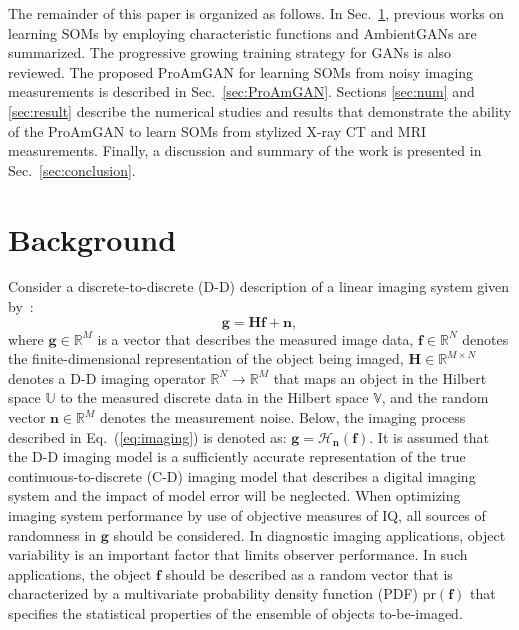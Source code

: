 \documentclass[journal]{IEEEtran}
\begin{document}
The remainder of this paper is organized as follows. 
In Sec.~\ref{sec:bkgd}, previous works on learning SOMs
 by employing characteristic functions and AmbientGANs 
are summarized.  
The progressive growing training strategy for GANs is also reviewed.
The proposed ProAmGAN for learning SOMs from noisy
 imaging measurements is described in Sec.~\ref{sec:ProAmGAN}.
Sections \ref{sec:num} and \ref{sec:result} describe the numerical studies and results
that demonstrate the ability of the ProAmGAN to learn SOMs from
stylized X-ray CT and MRI measurements.
Finally,  a discussion and summary of the work is presented in
Sec.~\ref{sec:conclusion}.

\section{Background}
\label{sec:bkgd}

Consider a discrete-to-discrete (D-D) description of 
a linear imaging system given by~\cite{barrett2013foundations}:
\begin{equation}\label{eq:imaging}
    \mathbf{g} = \mathbf{H}\mathbf{f} + \mathbf{n},
\end{equation}
%
\noindent where $\mathbf{g} \in \mathbb{R}^M$ is a vector that describes the measured image data,
$\mathbf{f} \in \mathbb{R}^N$ denotes the finite-dimensional representation of the object being imaged, 
$\mathbf{H}\in \mathbb{R}^{M\times N}$ denotes a D-D imaging operator $\mathbb{R}^N\rightarrow \mathbb{R}^M$ that maps an object in the Hilbert space $\mathbb{U}$ to the measured discrete data in the Hilbert space $\mathbb{V}$, 
and the random vector $\mathbf{n} \in \mathbb{R}^M$ denotes the measurement noise. 
Below, the imaging process described in Eq.~(\ref{eq:imaging}) is denoted as: $\mathbf{g} = \mathcal{H}_{\mathbf{n}}(\mathbf{f})$.  
It is assumed that the D-D imaging model is a sufficiently accurate representation
of the true continuous-to-discrete (C-D) imaging model that describes a digital imaging system and the impact of model error will be neglected.
When optimizing imaging system performance by use of objective measures of IQ, all sources
of randomness in $\mathbf{g}$ should be considered. In diagnostic imaging applications,
object variability is an important factor that limits observer performance.
In such applications, the object  $\mathbf{f}$ should be described as a random vector
that is characterized by a multivariate probability density function (PDF)
 $\textrm{pr}(\mathbf{f})$ that specifies the
statistical properties of the ensemble of objects to-be-imaged.
\end{document}
